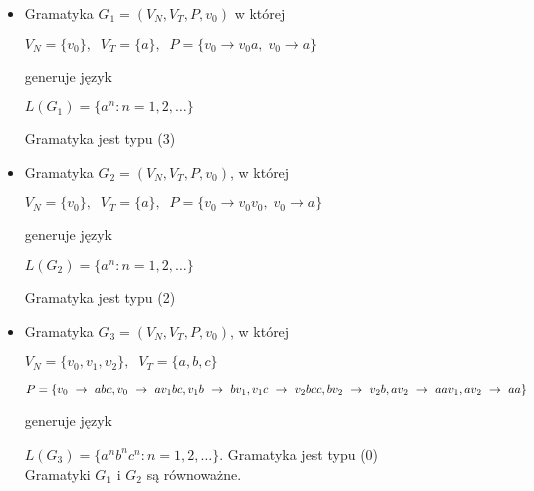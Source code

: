 \documentclass[main.tex]{subfiles}
\begin{document}
    \begin{itemize}
        \item Gramatyka $G_1 = (V_N,V_T,P,v_0)$ w której

        $V_N = \{v_0\}, \;\; V_T = \{a\}, \;\; P = \{ v_0 \rightarrow v_0 a, \; v_0 \rightarrow a \}$

        generuje język

        $L(G_1) = \{ a^n : n = 1,2,\dots \}$

        Gramatyka jest typu (3)

        \item Gramatyka $G_2 = (V_N,V_T,P,v_0)$, w której

        $V_N = \{v_0\}, \;\; V_T = \{a\}, \;\; P = \{ v_0 \rightarrow v_0 v_0, \; v_0 \rightarrow a \}$

        generuje język


        $L(G_2) = \{ a^n : n = 1,2,\dots \}$

        Gramatyka jest typu (2)


        \item Gramatyka $G_3 = (V_N,V_T,P,v_0)$, w której

        $V_N = \{v_0, v_1, v_2 \}, \;\; V_T = \{a,b,c\}$

        $P=\{v_0~\rightarrow~abc, v_0~\rightarrow~a v_1 bc, v_1 b~\rightarrow~b v_1,v_1 c~\rightarrow~v_2 bcc, bv_2~\rightarrow~ v_2 b,  \\ av_2~\rightarrow~aav_1, av_2~\rightarrow~aa\}$

        generuje język

        $L(G_3) = \{ a^n b^n c^n : n = 1,2,\dots \}$.
        Gramatyka jest typu (0)
        \\

        Gramatyki $G_1$ i $G_2$ są równoważne.
    \end{itemize}

    \newpage
\end{document}
